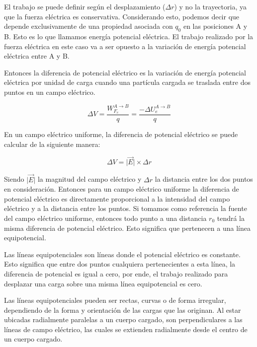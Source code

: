\documentclass{article}
\begin{document}
El trabajo se puede definir según el desplazamiento ($\Delta r$) y no la trayectoria, ya que la fuerza eléctrica es conservativa. Considerando esto, podemos decir que depende exclusivamente de una propiedad asociada con $q_0$ en las posiciones A y B. Esto es lo que llamamos energía potencial eléctrica. El trabajo realizado por la fuerza eléctrica en este caso va a ser opuesto a la variación de energía potencial eléctrica entre A y B.

Entonces la diferencia de potencial eléctrico es la variación de energía potencial eléctrica por unidad de carga cuando una partícula cargada se traslada entre dos puntos en un campo eléctrico.

\begin{equation*}
  \Delta V=\frac{W_{F_e}^{A \rightarrow B}}{q}=\frac{-\Delta U_e^{A \rightarrow B}}{q}
\end{equation*}

En un campo eléctrico uniforme, la diferencia de potencial eléctrico se puede calcular de la siguiente manera:

\begin{equation}
  \Delta V = \lvert \vec{E} \rvert \times \Delta r
  \label{eq:DelV}
\end{equation}

Siendo $\lvert \vec{E} \rvert$ la magnitud del campo eléctrico y $\Delta r$ la distancia entre los dos puntos en consideración. Entonces para un campo eléctrico uniforme la diferencia de potencial eléctrico es directamente proporcional a la intensidad del campo eléctrico y a la distancia entre los puntos. Si tomamos como referencia la fuente del campo eléctrico uniforme, entonces todo punto a una distancia $r_0$ tendrá la misma diferencia de potencial eléctrico. Esto significa que pertenecen a una línea equipotencial.

Las líneas equipotenciales son líneas donde el potencial eléctrico es constante. Esto significa que entre dos puntos cualquiera pertenecientes a esta línea, la diferencia de potencial es igual a cero, por ende, el trabajo realizado para desplazar una carga sobre una misma línea equipotencial es cero.

Las líneas equipotenciales pueden ser rectas, curvas o de forma irregular, dependiendo de la forma y orientación de las cargas que las originan. Al estar ubicadas radialmente paralelas a un cuerpo cargado, son perpendiculares a las líneas de campo eléctrico, las cuales se extienden radialmente desde el centro de un cuerpo cargado.
\end{document}
